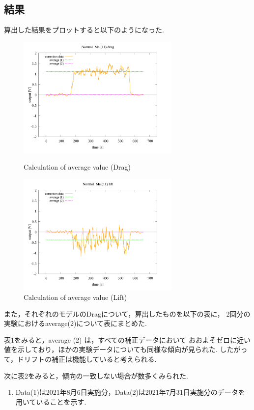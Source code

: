 \documentclass[twocolumn,a4j]{jsarticle}
\begin{document}
\subsection{結果}
算出した結果をプロットすると以下のようになった.\par
\begin{figure}[htbp]
    \footnotesize
    \begin{center}
        \includegraphics[width=80mm]{images/Normal_ma(11)_drag_05.png}
        \caption{Calculation of average value (Drag)}
        \includegraphics[width=80mm]{images/Normal_ma(11)_lift_05.png}
        \caption{Calculation of average value (Lift)}
    \end{center}
\end{figure}
また，それぞれのモデルのDragについて，算出したものを以下の表に，
2回分の実験におけるaverage(2)について表にまとめた.\par
表1をみると，average (2) は，すべての補正データにおいて
おおよそゼロに近い値を示しており，ほかの実験データについても同様な傾向が見られた.
したがって，ドリフトの補正は機能していると考えられる.\par
次に表2をみると，傾向の一致しない場合が数多くみられた.
\begin{enumerate}[※]
    \item Data(1)は2021年8月6日実施分，Data(2)は2021年7月31日実施分のデータを用いていることを示す.
\end{enumerate}
\end{document}
